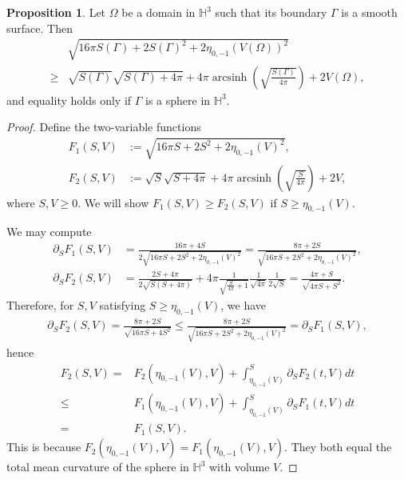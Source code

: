 \documentclass[11pt]{amsart}
\theoremstyle{definition}
\newcommand{\HH}{\mathbb{H}}
\newcommand{\p}{\partial}
\newtheorem{prop}{Proposition}[section]
\theoremstyle{remark}
\numberwithin{equation}{section}
\begin{document}
		\begin{prop}\label{prop:compare-inequality}
			Let $\Omega$ be a domain in $\HH^3$ such that its boundary $\Gamma$ is a smooth surface. Then
			\begin{align}
				\label{note2.prop}
				&\sqrt{16\pi S(\Gamma)+ 2 S(\Gamma)^2 + 2  \eta_{0,-1}(V(\Omega))^2} 
				\\
				\nonumber
				\geq
				&
				\sqrt{S(\Gamma)}\sqrt{S(\Gamma)+4\pi} + 4\pi \operatorname{arcsinh}\left( \sqrt{\frac{S(\Gamma)}{4\pi}} \right)
				+ 2 V(\Omega),
			\end{align}
			and equality holds only if $\Gamma$ is a sphere in $\HH^3$.
		\end{prop}
		\begin{proof}
			Define the two-variable functions
			\begin{align*}
				F_1(S,V)&:=\sqrt{16\pi S + 2S^2 + 2 \eta_{0,-1}(V)^2},
				\\
				F_2(S,V)&:=\sqrt{S}\sqrt{S+4\pi} + 4\pi \operatorname{arcsinh}\left( \sqrt{\frac{S}{4\pi}} \right) + 2V,
			\end{align*}
			where $S, V \geq 0$.
			We will show $F_1(S,V) \geq F_2(S,V)$ if $S \geq \eta_{0,-1}(V)$.
			
			We may compute
			\begin{align*}
				\p_{S}F_1(S,V) 
				&= \frac{16\pi + 4 S}{2\sqrt{16\pi S + 2S^2 + 2 \eta_{0,-1}(V)^2}}
				= \frac{8\pi + 2 S}{\sqrt{16\pi S + 2S^2 + 2 \eta_{0,-1}(V)^2}},
				\\
				\p_{S}F_2(S,V)
				&= \frac{2 S + 4\pi}{2\sqrt{S(S+4\pi)}}
				+
				4\pi \frac{1}{\sqrt{\frac{S}{4\pi}+1}} \frac{1}{\sqrt{4\pi}} \frac{1}{2 \sqrt{S}}
				= \frac{4\pi + S}{\sqrt{4\pi S + S^2}}.
			\end{align*}
			Therefore, for $S, V$ satisfying $S \geq \eta_{0,-1}(V)$, we have
			\begin{align}\label{Note2.tmp.compare}
				\p_{S}F_2(S,V) 
				= \frac{8\pi + 2S}{\sqrt{16\pi S + 4 S^2}}
				\leq \frac{8\pi + 2S}{\sqrt{16\pi S + 2S^2 + 2 \eta_{0,-1}(V)^2}} 
				= \p_{S}F_1(S,V),
			\end{align}
			hence
			\begin{align*}
				F_2(S,V) 
				= 
				&
				F_2(\eta_{0,-1}(V), V) + \int_{\eta_{0,-1}(V)}^{S} \p_{S}F_2(t,V) dt
				\\
				\leq
				&
				F_1(\eta_{0,-1}(V), V) + \int_{\eta_{0,-1}(V)}^{S} \p_{S}F_1(t,V) dt
				\\
				=
				&
				F_1(S,V).
			\end{align*}
			This is because $ F_2(\eta_{0,-1}(V), V) =F_1(\eta_{0,-1}(V), V)$. They both equal the total mean curvature of the sphere in $\HH^3$ with volume $V$.
			

\end{proof}
\end{document}

